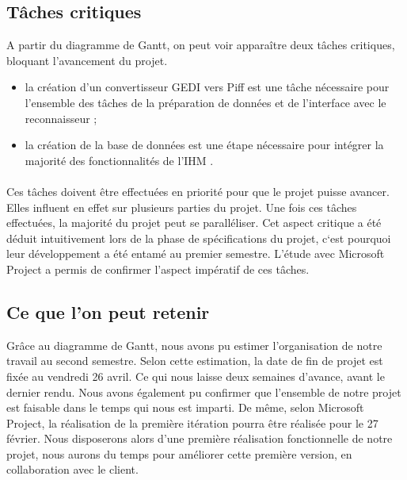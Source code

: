 \subsection{Tâches critiques}

A partir du diagramme de Gantt, on peut voir apparaître deux tâches critiques, bloquant l’avancement du projet.

\begin{itemize}
\item la création d’un convertisseur GEDI vers Piff est une tâche nécessaire pour l’ensemble des tâches de la préparation de données et de l’interface avec le reconnaisseur ;
\item la création de la base de données est une étape nécessaire pour intégrer la majorité des fonctionnalités de l’IHM .
\end{itemize}

\paragraph{}

Ces tâches doivent être effectuées en priorité pour que le projet puisse avancer. Elles influent en effet sur plusieurs parties du projet. Une fois ces tâches effectuées, la majorité du projet peut se paralléliser. Cet aspect critique a été déduit intuitivement lors de la phase de spécifications du projet, c‘est pourquoi leur développement a été entamé au premier semestre. L’étude avec Microsoft Project a permis de confirmer l’aspect impératif de ces tâches.

\subsection{Ce que l'on peut retenir}

Grâce au diagramme de Gantt, nous avons pu estimer l’organisation de notre travail au second semestre. Selon cette estimation, la date de fin de projet est fixée au vendredi 26 avril. Ce qui nous laisse deux semaines d’avance, avant le dernier rendu. Nous avons également pu confirmer que l’ensemble de notre projet est faisable dans le temps qui nous est imparti. De même, selon Microsoft Project, la réalisation de la première itération pourra être réalisée pour le 27 février. Nous disposerons alors d’une première réalisation fonctionnelle de notre projet, nous aurons du temps pour améliorer cette première version, en collaboration avec le client.















